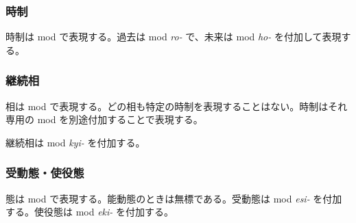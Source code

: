 \subsubsection{時制}

時制は mod で表現する。過去は mod \emph{ro-} で、未来は mod \emph{ho-} を付加して表現する。

\subsubsection{継続相}

相は mod で表現する。どの相も特定の時制を表現することはない。時制はそれ専用の mod を別途付加することで表現する。

継続相は mod \emph{kyi-} を付加する。

\subsubsection{受動態・使役態}

態は mod で表現する。能動態のときは無標である。受動態は mod \emph{esi-} を付加する。使役態は mod \emph{eki-} を付加する。
